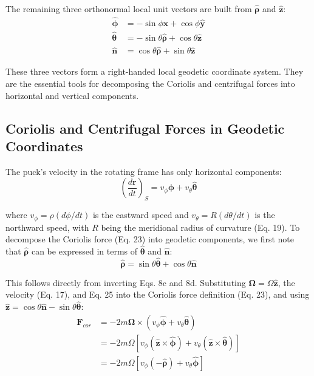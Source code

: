 \documentclass[10pt, a4paper]{article}
\begin{document}
The remaining three orthonormal local unit vectors are built from $\hat{\boldsymbol{\rho}}$ and $\hat{\mathbf{z}}$:
\begin{align}
\hat{\boldsymbol{\phi}} &= -\sin\phi \hat{\mathbf{x}} + \cos\phi \hat{\mathbf{y}} \label{eq:8b} \\
\hat{\boldsymbol{\theta}} &= -\sin\theta \hat{\boldsymbol{\rho}} + \cos\theta \hat{\mathbf{z}} \label{eq:8c} \\
\hat{\mathbf{n}} &= \cos\theta \hat{\boldsymbol{\rho}} + \sin\theta \hat{\mathbf{z}} \label{eq:8d}
\end{align}

These three vectors form a right-handed local geodetic coordinate system. They are the essential tools for decomposing the Coriolis and centrifugal forces into horizontal and vertical components.

\subsection{Coriolis and Centrifugal Forces in Geodetic Coordinates}
The puck’s velocity in the rotating frame has only horizontal components: 
\begin{equation}
\left(\frac{d\mathbf{r}}{dt}\right)_S = v_\phi \hat{\boldsymbol{\phi}} + v_\theta \hat{\boldsymbol{\theta}} \label{eq:17}
\end{equation}

where $v_\phi = \rho(d\phi/dt)$ is the eastward speed and $v_\theta = R(d\theta/dt)$ is the northward speed, with $R$ being the meridional radius of curvature (Eq. 19). To decompose the Coriolis force (Eq. 23) into geodetic components, we first note that $\hat{\boldsymbol{\rho}}$ can be expressed in terms of $\hat{\boldsymbol{\theta}}$ and $\hat{\mathbf{n}}$: 
\begin{equation}
\hat{\boldsymbol{\rho}} = \sin\theta \hat{\boldsymbol{\theta}} + \cos\theta \hat{\mathbf{n}} \label{eq:25}
\end{equation}

This follows directly from inverting Eqs. 8c and 8d. Substituting $\boldsymbol{\Omega} = \Omega\hat{\mathbf{z}}$, the velocity (Eq. 17), and Eq. 25 into the Coriolis force definition (Eq. 23), and using $\hat{\mathbf{z}} = \cos\theta \hat{\mathbf{n}} - \sin\theta \hat{\boldsymbol{\theta}}$:
\begin{align*}
\mathbf{F}_{cor} &= -2m\boldsymbol{\Omega} \times (v_\phi \hat{\boldsymbol{\phi}} + v_\theta \hat{\boldsymbol{\theta}}) \\
&= -2m\Omega [v_\phi (\hat{\mathbf{z}} \times \hat{\boldsymbol{\phi}}) + v_\theta (\hat{\mathbf{z}} \times \hat{\boldsymbol{\theta}})] \\
&= -2m\Omega [v_\phi (-\hat{\boldsymbol{\rho}}) + v_\theta \hat{\boldsymbol{\phi}}]
\end{align*}
\end{document}
